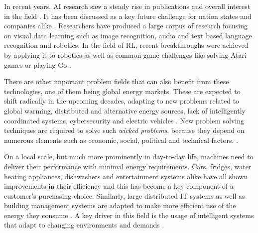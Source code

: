 
In recent years, \ac{AI} research saw a steady rise in publications and overall interest in the field
\citep{arulkumaran2017brief, russell2016artificial}.
It has been discussed as a key future challenge for nation states and companies alike
\citep{mozur_markoff_2017, faznetchina_2018}. Researchers have produced a large corpus of research focusing on visual
data learning such as image recognition, audio and text based language recognition and robotics. In the field of
\ac{RL}, recent breakthroughs were achieved by applying it to robotics as well as common game challenges like solving Atari games or
playing Go
\citep{arulkumaran2017brief}.

There are other important problem fields that can also benefit from these technologies, one of them being global energy markets.
These are expected to shift radically in the upcoming decades, adapting to new problems related to global warming,
distributed and alternative energy sources, lack of intelligently coordinated systems, cybersecurity  and electric vehicles \cite[p.10ff.]{mitei2011}. New problem solving techniques are required to solve such \emph{wicked problems}, because
they depend on numerous elements such as economic, social, political and technical factors.
\citep{ketter2015competitive}.

On a local scale, but much more prominently in day-to-day life, machines need to deliver their performance with minimal
energy requirements. Cars, fridges, water heating appliances, dishwashers and entertainment systems alike have all shown
improvements in their efficiency and this has become a key component of a customer's purchasing choice.  Similarly,
large distributed IT systems as well as building management systems are adapted to make more efficient use of the energy
they consume \citep{Orgerie:2014:STI:2597757.2532637}. A key driver in this field is
the usage of intelligent systems that adapt to changing environments and demands \citep{DePaola:2014:IMS:2620784.2611779}.

